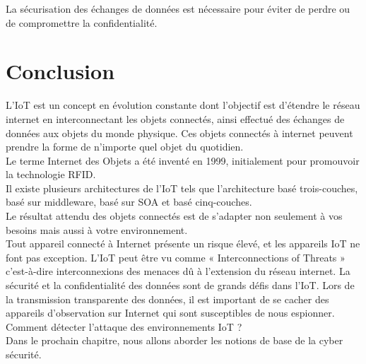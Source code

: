 La sécurisation des échanges de données est nécessaire pour éviter de perdre ou de compromettre la conf{\kern0pt}identialité.


	\section{Conclusion}
L’IoT est un concept en évolution constante dont l’objectif est d’étendre le réseau internet en interconnectant les objets connectés, ainsi ef{\kern0pt}fectué des échanges de données aux objets du monde physique. Ces objets connectés à internet peuvent prendre la forme de n’importe quel objet du quotidien.\\
	
Le terme \og Internet des Objets \fg{} a été inventé en 1999, initialement pour promouvoir la technologie RFID.\\

Il existe plusieurs architectures de l’IoT tels que l’architecture basé trois-couches, basé sur middleware, basé sur SOA et basé cinq-couches.\\

Le résultat attendu des objets connectés est de s’adapter non seulement à vos besoins mais aussi à votre environnement.\\

Tout appareil connecté à Internet présente un risque élevé, et les appareils IoT ne font pas exception. L’IoT peut être vu comme « Interconnections of Threats » c’est-à-dire interconnexions des menaces dû à l’extension du réseau internet. La sécurité et la conf{\kern0pt}identialité des données sont de grands déf{\kern0pt}is dans l’IoT. Lors de la transmission transparente des données, il est important de se cacher des appareils d'observation sur Internet qui sont susceptibles de nous espionner.\\

Comment détecter l’attaque des environnements IoT ?\\
Dans le prochain chapitre, nous allons aborder les notions de base de la cyber sécurité.
	
	